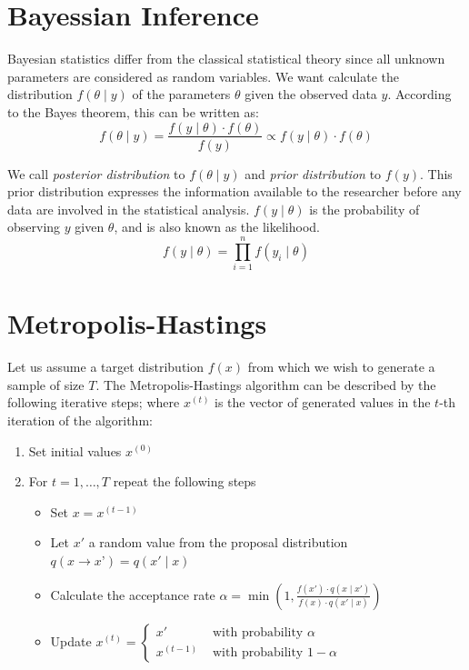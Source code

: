 \documentclass[11pt,fleqn]{book} %
\begin{document}
\section{Bayessian Inference}

Bayesian statistics differ from the classical statistical 
theory since all unknown parameters are considered as random 
variables. We want calculate the distribution $f(\theta \mid y)$ 
of the parameters $\theta$ given the observed data $y$. 
According to the Bayes theorem, this can be written as:
\begin{displaymath}
	f(\theta \mid y) = \frac{f(y \mid \theta) \cdot f(\theta)}{f(y)} \propto f(y \mid \theta) \cdot f(\theta)
\end{displaymath}

We call \emph{posterior distribution} to $f(\theta \mid y)$ and 
\emph{prior distribution} to $f(y)$. This prior distribution 
expresses the information available to the researcher before 
any data are involved in the statistical analysis. $f(y \mid \theta)$ 
is the probability of observing $y$ given $\theta$, and is also 
known as the likelihood.
\begin{displaymath}
	f(y \mid \theta) = \prod_{i=1}^n f(y_i \mid \theta)
\end{displaymath}


\section{Metropolis-Hastings}

\begin{algorithm}
	Let us assume a target distribution $f(x)$ from which we wish to generate a 
	sample of size $T$. The Metropolis-Hastings algorithm can be described by the 
	following iterative steps; where $x^{(t)}$ is the vector of generated values 
	in the $t$-th iteration of the algorithm:
	\begin{enumerate}
		\item Set initial values $x^{(0)}$
		\item For $t=1,\dots,T$ repeat the following steps
		\begin{itemize}
			\item Set $x=x^{(t-1)}$
			\item Let $x'$ a random value from the proposal distribution $q(x \to x’)=q(x' \mid x)$
			\item Calculate the acceptance rate 
			$\alpha = \min\left(1,\frac{f(x') \cdot q(x \mid x')}{f(x) \cdot q(x' \mid x)}\right)$
			\item Update $x^{(t)}=\left\{
			\begin{array}{ll}
				x'        & \text{ with probability } \alpha   \\
				x^{(t-1)} & \text{ with probability } 1-\alpha 
			\end{array}\right.$ 
		\end{itemize}
	\end{enumerate}
\end{algorithm}
\end{document}
